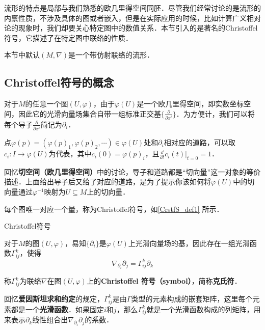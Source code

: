 

流形的特点是局部与我们熟悉的欧几里得空间同胚．尽管我们经常讨论的是流形的内禀性质，不涉及具体的图或者嵌入，但是在实际应用的时候，比如计算广义相对论的现象时，我们却要关心特定图中的数值关系．本节引入的是著名的Christoffel符号，它描述了在特定图中联络的性质．

本节中默认$(M, \nabla)$是一个带仿射联络的流形．


\subsection{Christoffel符号的概念}

对于$M$的任意一个图$(U, \varphi)$，由于$\varphi(U)$是一个欧几里得空间，即实数坐标空间，因此它的光滑向量场集合自带一组标准正交基$\{\frac{\partial}{\partial x^i}\}$．为方便计，我们可以将每个导子$\frac{\partial}{\partial x^i}$简记为$\partial_i$．

点$\varphi(p)=(\varphi(p)_1, \varphi(p)_2, \cdots)\in\varphi(U)$处和$\partial_i$相对应的道路，可以取$c_i:I\to \varphi(U)$为代表，其中$c_i(0)=\varphi(p)_i$，且$\frac{\dd}{\dd t}c_i(t)|_{t=0}=1$．

回忆\textbf{切空间（欧几里得空间）}中的讨论，导子和道路都是“切向量”这一对象的等价描述．上面给出导子后又给了对应的道路，是为了提示你该如何将$\varphi(U)$中的切向量通过$\varphi^{-1}$映射为$U\subseteq M$上的切向量．

每个图唯一对应一个量，称为Christoffel符号，如\autoref{CrstfS_def1} 所示．

\begin{definition}{Christoffel符号}\label{CrstfS_def1}

对于$M$的图$(U, \varphi)$，易知$\{\partial_i\}$是$\varphi(U)$上光滑向量场的基，因此存在一组光滑函数$\Gamma^k_{ij}$，使得
\begin{equation}
\nabla_{\partial_i}\partial_j=\Gamma^k_{ij}\partial_k
\end{equation}

称$\Gamma^k_{ij}$为联络$\nabla$在图$(U, \varphi)$上的\textbf{Christoffel 符号（symbol）}，简称\textbf{克氏符}．
\end{definition}

回忆\textbf{爱因斯坦求和约定}的规定，$\Gamma^k_{ij}$是由$\Gamma$类型的元素构成的嵌套矩阵，这里每个元素都是一个\textbf{光滑函数}．如果固定$i$和$j$，那么$\Gamma^k_{ij}$就是一个光滑函数构成的列矩阵，用来表示$\partial_k$线性组合出$\nabla_{\partial_i}\partial_j$的系数．

